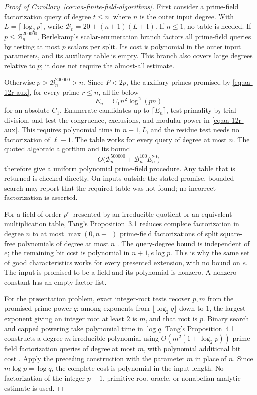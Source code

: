 \documentclass[11pt]{article}
\theoremstyle{definition}
\theoremstyle{remark}
\begin{document}
\begin{proof}[Proof of Corollary~\ref{cor:aa-finite-field-algorithms}]
First consider a prime-field factorization query of degree \(t\leq n\),
where \(n\) is the outer input degree. With
\(L=\lceil\log_2p\rceil\), write
\(\mathcal B_n=20+(n+1)(L+1)\).
If \(n\leq1\), no table is needed.
If \(p\leq\mathcal B_n^{200000}\), Berlekamp's scalar-enumeration
branch factors all prime-field queries by testing at most \(p\)
scalars per split. Its cost is polynomial in the outer
input parameters, and its auxiliary table is empty.
This branch also covers large degrees relative to \(p\); it does
not require the almost-all estimate.

Otherwise \(p>\mathcal B_n^{200000}>n\). Since \(P<2p\), the
auxiliary primes promised by \eqref{eq:aa-12r-aux}, for every
prime \(r\leq n\), all lie below
\[
 E_n=C_1 n^2\log^2(pn)
\]
for an absolute \(C_1\). Enumerate candidates up to
\(\lceil E_n\rceil\), test primality by trial division, and test
the congruence, exclusions, and modular power in
\eqref{eq:aa-12r-aux}. This requires polynomial time in
\(n+1,L\), and the residue test needs no factorization of
\(\ell-1\). The table works for every query of degree at most \(n\).
The quoted algebraic algorithm and its bound
\[
 O\bigl(\mathcal B_n^{500000}
             +\mathcal B_n^{100}E_n^{20}\bigr)
\]
therefore give a uniform polynomial prime-field procedure.
Any table that is returned is checked directly. On inputs outside
the stated promise, bounded search may report that the required
table was not found; no incorrect factorization is asserted.

For a field of order \(p^e\) presented by an irreducible
quotient or an equivalent multiplication table, Tang's
Proposition~3.1 reduces complete factorization in degree \(n\) to
at most \(\max(0,n-1)\) prime-field factorizations of split
square-free polynomials of degree at most \(n\)
\citep[pp.~4--5]{Tang2026}.
The query-degree bound is independent of \(e\); the remaining
bit cost is polynomial in \(n+1,e\log p\).
This is why the same set of good characteristics works for
every presented extension, with no bound on \(e\).
The input is promised to be a field and its polynomial is nonzero.
A nonzero constant has an empty factor list.

For the presentation problem, exact integer-root tests recover
\(p,m\) from the promised prime power \(q\): among exponents from
\(\lfloor\log_2q\rfloor\) down to \(1\), the largest exponent giving
an integer root at least \(2\) is \(m\), and that root is \(p\).
Binary search and capped powering take polynomial time in
\(\log q\). Tang's Proposition~4.1 constructs a degree-\(m\)
irreducible polynomial using
\(O(m^2(1+\log_2p))\) prime-field factorization queries of
degree at most \(m\), with polynomial additional bit cost
\citep[pp.~5--7]{Tang2026}.
Apply the preceding construction with the parameter \(m\)
in place of \(n\). Since \(m\log p=\log q\), the complete cost
is polynomial in the input length. No factorization of the
integer \(p-1\), primitive-root oracle, or nonabelian analytic
estimate is used.
\end{proof}
\end{document}

